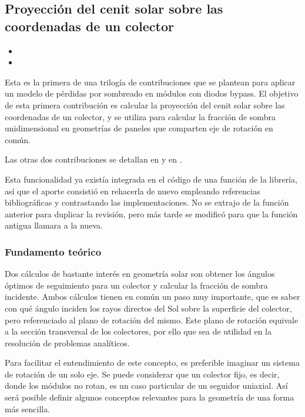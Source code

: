 \subsection{Proyección del cenit solar sobre las coordenadas de un colector} \label{sct:desarrollo:contribuciones_cientificas:proyeccion_cenit}

\begin{itemize}
    \item {}
    \item {}
\end{itemize}

Esta es la primera de una trilogía de contribuciones que se plantean para aplicar un \gls{modelo} de pérdidas por sombreado en módulos con diodos bypass. El objetivo de esta primera contribución es calcular la proyección del \gls{cenit} solar sobre las coordenadas de un colector, y se utiliza para calcular la fracción de \gls{sombra} unidimensional en geometrías de paneles que comparten eje de rotación en común.

Las otras dos contribuciones se detallan en  y en .

Esta funcionalidad ya existía integrada en el código de una función de la librería, así que el aporte consistió en rehacerla de nuevo empleando referencias bibliográficas y contrastando las implementaciones. No se extrajo de la función anterior para duplicar la revisión, pero más tarde se modificó para que la función antigua llamara a la nueva.

\subsubsection{Fundamento teórico}

Dos cálculos de bastante interés en geometría solar son obtener los \gls{ángulos óptimos de seguimiento} para un colector y calcular la fracción de \gls{sombra} incidente. Ambos cálculos tienen en común un paso muy importante, que es saber con qué ángulo inciden los rayos directos del Sol sobre la superficie del colector, pero referenciado al plano de rotación del mismo. Este plano de rotación equivale a la sección transversal de los colectores, por ello que sea de utilidad en la resolución de problemas analíticos.

Para facilitar el entendimiento de este concepto, es preferible imaginar un sistema de rotación de un solo eje. Se puede considerar que un colector fijo, es decir, donde los módulos no rotan, es un caso particular de un seguidor uniaxial. Así será posible definir algunos conceptos relevantes para la geometría de una forma más sencilla.

